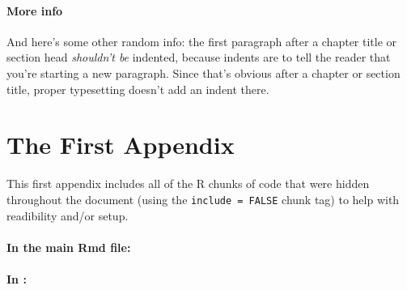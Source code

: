 \documentclass[12pt,twoside]{reedthesis}
\begin{document}
  \subsubsection{More info}\label{more-info}
  
  And here's some other random info: the first paragraph after a chapter
  title or section head \emph{shouldn't be} indented, because indents are
  to tell the reader that you're starting a new paragraph. Since that's
  obvious after a chapter or section title, proper typesetting doesn't add
  an indent there.
  
  \appendix
  
  \chapter{The First Appendix}\label{the-first-appendix}
  
  This first appendix includes all of the R chunks of code that were
  hidden throughout the document (using the \texttt{include\ =\ FALSE}
  chunk tag) to help with readibility and/or setup.
  
  \subsubsection{In the main Rmd file:}\label{in-the-main-rmd-file}
  
  \begin{Shaded}
  \begin{Highlighting}[]
    \NormalTok{(}\NormalTok{, } \NormalTok{)}
    \NormalTok{(}\NormalTok{)}
  \NormalTok{\}}
  \end{Highlighting}
  \end{Shaded}
  
  \subsubsection{\texorpdfstring{In
  \protect\hyperlink{ref_labels}{}:}{In :}}\label{in}
  
\end{document}
